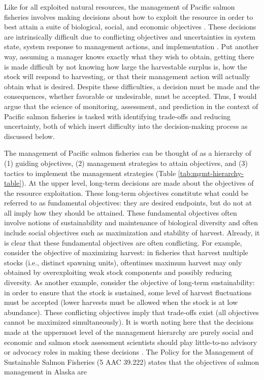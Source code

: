 \documentclass[12pt,]{book}
\theoremstyle{definition}
\theoremstyle{definition}
\theoremstyle{definition}
\theoremstyle{remark}
\begin{document}
Like for all exploited natural resources, the management of Pacific
salmon fisheries involves making decisions about how to exploit the
resource in order to best attain a suite of biological, social, and
economic objectives \citep{walters-1986}. These decisions are
intrinsically difficult due to conflicting objectives and uncertainties
in system state, system response to management actions, and
implementation \citep{walters-holling-1990}. Put another way, assuming a
manager knows exactly what they wish to obtain, getting there is made
difficult by not knowing how large the harvestable surplus is, how the
stock will respond to harvesting, or that their management action will
actually obtain what is desired. Despite these difficulties, a decision
must be made \citep[without decision-making there is no
management;][]{hilborn-walters-1992} and the consequences, whether
favorable or undesirable, must be accepted. Thus, I would argue that the
science of monitoring, assessment, and prediction in the context of
Pacific salmon fisheries is tasked with identifying trade-offs and
reducing uncertainty, both of which insert difficulty into the
decision-making process as discussed below.

The management of Pacific salmon fisheries can be thought of as a
hierarchy of (1) guiding objectives, (2) management strategies to attain
objectives, and (3) tactics to implement the management strategies
(Table \ref{tab:mgmt-hierarchy-table}). At the upper level, long-term
decisions are made about the objectives of the resource exploitation.
These long-term objectives constitute what could be referred to as
fundamental objectives: they are desired endpoints, but do not at all
imply how they should be attained. These fundamental objectives often
involve notions of sustainability and maintenance of biological
diversity and often include social objectives such as maximization and
stability of harvest. Already, it is clear that these fundamental
objectives are often conflicting. For example, consider the objective of
maximizing harvest: in fisheries that harvest multiple stocks (i.e.,
distinct spawning units), oftentimes maximum harvest may only obtained
by overexploiting weak stock components and possibly reducing diversity.
As another example, consider the objective of long-term sustainability:
in order to ensure that the stock is sustained, some level of harvest
fluctuations must be accepted (lower harvests must be allowed when the
stock is at low abundance). These conflicting objectives imply that
trade-offs exist (all objectives cannot be maximized simultaneously). It
is worth noting here that the decisions made at the uppermost level of
the management hierarchy are purely social and economic and salmon stock
assessment scientists should play little-to-no advisory or advocacy
roles in making these decisions \citep{walters-martell-2004}. The Policy
for the Management of Sustainable Salmon Fisheries (5 AAC 39.222) states
that the objectives of salmon management in Alaska are
\end{document}
